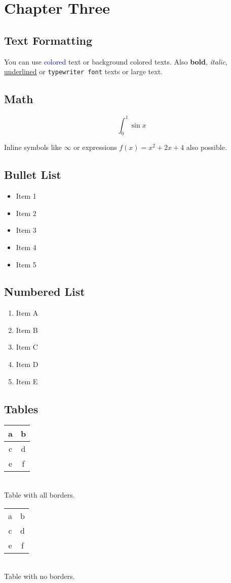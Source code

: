 \documentclass[12pt, twoside]{book}
\begin{document}
\chapter{Chapter Three}
\section{Text Formatting}
You can use \textcolor{blue}{colored} text or \colorbox{BurntOrange}{background colored} texts. Also \textbf{bold}, \textit{italic}, \underline{underlined} or \texttt{typewriter font} texts or \large{large} text.

\section{Math}
$$\int_0^1{\sin x}$$

Inline symbols like $\infty$ or expressions $f(x) = x^2 + 2x + 4$ also possible.

\section{Bullet List}

\begin{itemize}
    \item Item 1
    \item Item 2
    \item Item 3
    \item Item 4
    \item Item 5
\end{itemize}

\section{Numbered List}

\begin{enumerate}
    \item Item A
    \item Item B
    \item Item C
    \item Item D
    \item Item E
\end{enumerate}

\section{Tables}

\begin{center}
        \begin{tabular}{|c|c|} \hline
        a & b \\ \hline
        c & d \\ \hline
        e & f \\ \hline
    \end{tabular} \\[12pt]
    Table with all borders.
\end{center}

\vspace{1cm}

\begin{center}
        \begin{tabular}{cc}
        a & b \\
        c & d \\
        e & f \\
    \end{tabular} \\[12pt]
    Table with no borders.
\end{center}
\end{document}
